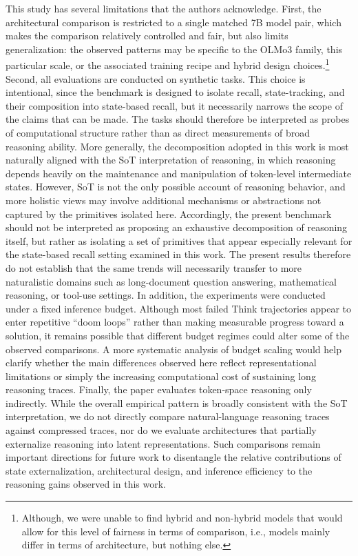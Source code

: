 \documentclass[11pt]{article}
\theoremstyle{definition}
\begin{document}
This study has several limitations that the authors acknowledge. First, the architectural comparison is restricted to a single matched 7B model pair, which makes the comparison relatively controlled and fair, but also limits generalization: the observed patterns may be specific to the OLMo3 family, this particular scale, or the associated training recipe and hybrid design choices.\footnote{Although, we were unable to find hybrid and non-hybrid models that would allow for this level of fairness in terms of comparison, i.e., models mainly differ in terms of architecture, but nothing else.} Second, all evaluations are conducted on synthetic tasks. This choice is intentional, since the benchmark is designed to isolate recall, state-tracking, and their composition into state-based recall, but it necessarily narrows the scope of the claims that can be made. The tasks should therefore be interpreted as probes of computational structure rather than as direct measurements of broad reasoning ability. More generally, the decomposition adopted in this work is most naturally aligned with the SoT interpretation of reasoning, in which reasoning depends heavily on the maintenance and manipulation of token-level intermediate states. However, SoT is not the only possible account of reasoning behavior, and more holistic views may involve additional mechanisms or abstractions not captured by the primitives isolated here. Accordingly, the present benchmark should not be interpreted as proposing an exhaustive decomposition of reasoning itself, but rather as isolating a set of primitives that appear especially relevant for the state-based recall setting examined in this work. The present results therefore do not establish that the same trends will necessarily transfer to more naturalistic domains such as long-document question answering, mathematical reasoning, or tool-use settings. In addition, the experiments were conducted under a fixed inference budget. Although most failed Think trajectories appear to enter repetitive ``doom loops'' rather than making measurable progress toward a solution, it remains possible that different budget regimes could alter some of the observed comparisons. A more systematic analysis of budget scaling would help clarify whether the main differences observed here reflect representational limitations or simply the increasing computational cost of sustaining long reasoning traces. Finally, the paper evaluates token-space reasoning only indirectly. While the overall empirical pattern is broadly consistent with the SoT interpretation, we do not directly compare natural-language reasoning traces against compressed traces, nor do we evaluate architectures that partially externalize reasoning into latent representations. Such comparisons remain important directions for future work to disentangle the relative contributions of state externalization, architectural design, and inference efficiency to the reasoning gains observed in this work.
\end{document}
